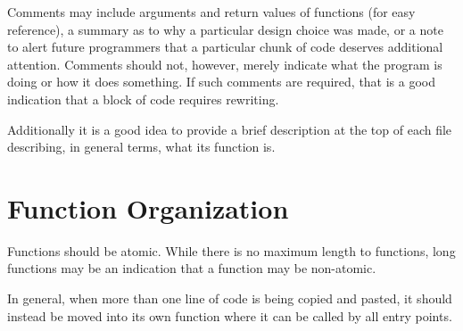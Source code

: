 \documentclass{article}
\begin{document}
Comments may include arguments and return values of functions (for
easy reference), a summary as to why a particular design choice was
made, or a note to alert future programmers that a particular chunk of
code deserves additional attention.  Comments should not, however,
merely indicate what the program is doing or how it does something.
If such comments are required, that is a good indication that a block
of code requires rewriting.

Additionally it is a good idea to provide a brief description at the top of each
file describing, in general terms, what its function is.

\section{Function Organization}

Functions should be atomic.  While there is no maximum length to functions, long
functions may be an indication that a function may be non-atomic.

In general, when more than one line of code is being copied and
pasted, it should instead be moved into its own function where it can
be called by all entry points.
\end{document}
